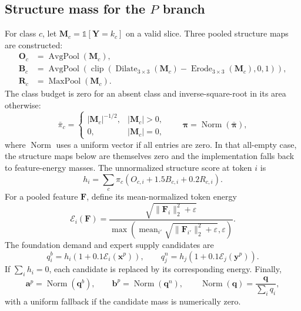 \documentclass[10pt]{article}
\newcommand{\one}{\mathbb{1}}
\newcommand{\eps}{\varepsilon}
\newcommand{\Norm}{\operatorname{Norm}}
\newcommand{\clip}{\operatorname{clip}}
\begin{document}
\subsection{Structure mass for the $P$ branch}

For class $c$, let $\bm{M}_c=\one[\bm{Y}=k_c]$ on a valid slice.  Three pooled
structure maps are constructed:
\begin{align}
    \bm{O}_c&=\operatorname{AvgPool}(\bm{M}_c),\\
    \bm{B}_c&=\operatorname{AvgPool}\!\left(
       \clip(\operatorname{Dilate}_{3\times3}(\bm{M}_c)
            -\operatorname{Erode}_{3\times3}(\bm{M}_c),0,1)
       \right),\\
    \bm{R}_c&=\operatorname{MaxPool}(\bm{M}_c).
\end{align}
The class budget is zero for an absent class and inverse-square-root in its area
otherwise:
\begin{equation}
    \bar\pi_c=
    \begin{cases}
      |\bm{M}_c|^{-1/2},&|\bm{M}_c|>0,\\
      0,&|\bm{M}_c|=0,
    \end{cases}
    \qquad
    \bm{\pi}=\Norm(\bar{\bm{\pi}}),
\end{equation}
where $\Norm$ uses a uniform vector if all entries are zero.  In that all-empty
case, the structure maps below are themselves zero and the implementation falls
back to feature-energy masses.
The unnormalized structure score at token $i$ is
\begin{equation}
    h_i=\sum_c\pi_c
       \left(O_{c,i}+1.5B_{c,i}+0.2R_{c,i}\right).
    \label{eq:structure-score}
\end{equation}
For a pooled feature $\bm{F}$, define its mean-normalized token energy
\begin{equation}
    \mathcal{E}_i(\bm{F})
    =\frac{\sqrt{\|\bm{F}_i\|_2^2+\eps}}
           {\max\!\left(
            \operatorname{mean}_{i'}
            \sqrt{\|\bm{F}_{i'}\|_2^2+\eps},\eps\right)}.
\end{equation}
The foundation demand and expert supply candidates are
\begin{equation}
    q_i^b=h_i\left(1+0.1\mathcal{E}_i(\bm{x}^p)\right),
    \qquad
    q_j^n=h_j\left(1+0.1\mathcal{E}_j(\bm{y}^p)\right).
\end{equation}
If $\sum_i h_i=0$, each candidate is replaced by its corresponding energy.
Finally,
\begin{equation}
    \bm{a}^p=\Norm(\bm{q}^b),\qquad
    \bm{b}^p=\Norm(\bm{q}^n),\qquad
    \Norm(\bm{q})=\frac{\bm{q}}{\sum_iq_i},
    \label{eq:p-mass}
\end{equation}
with a uniform fallback if the candidate mass is numerically zero.
\end{document}
